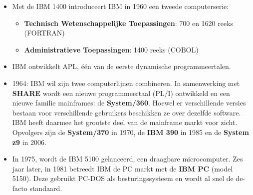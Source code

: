 \documentclass[../main.tex]{subfiles}
\begin{document}
\begin{solution}
\begin{itemize}
	\item Met de IBM 1400 introduceert IBM in 1960 een tweede computerserie:
	\begin{itemize}
		\item \textbf{Technisch Wetenschappelijke Toepassingen}: 700 en 1620 reeks (FORTRAN)
		\item \textbf{Administratieve Toepassingen}: 1400 reeks (COBOL)
	\end{itemize}
	\item IBM ontwikkelt APL, \'e\'en van de eerste dynamische programmeertalen.
	\item 1964: IBM wil zijn twee computerlijnen combineren. In samenwerking met \textbf{SHARE} wordt een nieuwe programmeertaal (PL/I) ontwikkeld en een nieuwe familie mainframes: de \textbf{System/360}. Hoewel er verschillende versies bestaan voor verschillende gebruikers beschikken ze over dezelfde software. IBM heeft daarmee het grootste deel van de mainframe markt voor zicht. Opvolgers zijn de \textbf{System/370} in 1970, de \textbf{IBM 390} in 1985 en de \textbf{System z9} in 2006.
	\item In 1975, wordt de IBM 5100 gelanceerd, een draagbare microcomputer. Zes jaar later, in 1981 betreedt IBM de PC markt met de \textbf{IBM PC} (model 5150). Deze gebruikt PC-DOS als besturingssysteem en wordt al snel de de-facto standaard.
\end{itemize}
\end{solution}
\end{document}

